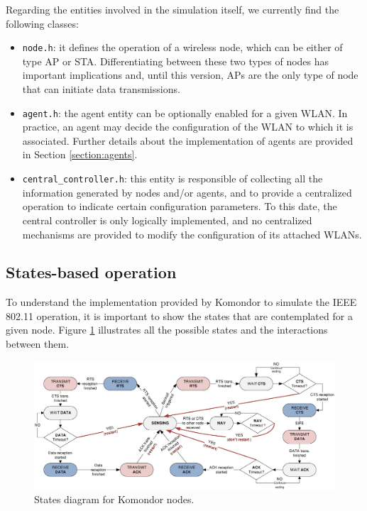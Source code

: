 \documentclass[a4paper]{article}
\begin{document}
Regarding the entities involved in the simulation itself, we currently find the following classes:
\begin{itemize}
	\item \texttt{node.h}: it defines the operation of a wireless node, which can be either of type AP or STA. Differentiating between these two types of nodes has important implications and, until this version, APs are the only type of node that can initiate data transmissions.
	\item \texttt{agent.h}: the agent entity can be optionally enabled for a given WLAN. In practice, an agent may decide the configuration of the WLAN to which it is associated. Further details about the implementation of agents are provided in Section \ref{section:agents}.
	\item \texttt{central\_controller.h}: this entity is responsible of collecting all the information generated by nodes and/or agents, and to provide a centralized operation to indicate certain configuration parameters. To this date, the central controller is only logically implemented, and no centralized mechanisms are provided to modify the configuration of its attached WLANs.
\end{itemize}

\subsection{States-based operation}
\label{section:states}
To understand the implementation provided by Komondor to simulate the IEEE 802.11 operation, it is important to show the states that are contemplated for a given node. Figure \ref{fig:state_diagram} illustrates all the possible states and the interactions between them.

\begin{figure}[h]
	\centering
	\includegraphics[width=\textwidth]{images/state_diagram.eps}
	\caption{States diagram for Komondor nodes.}    
	\label{fig:state_diagram}
\end{figure}
\end{document}
